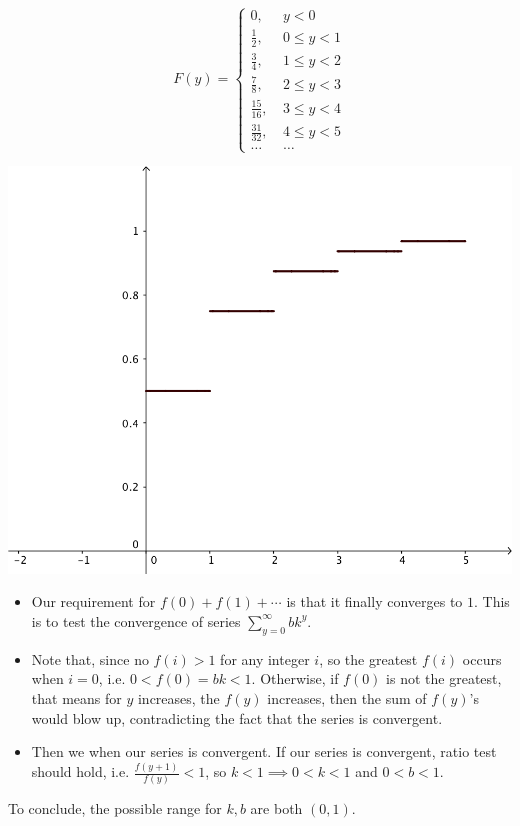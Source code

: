 \documentclass[a4paper, 11pt, twoside]{article}
\begin{document}
\[F(y)=\begin{cases}
0,\ &y<0\\
\frac{1}{2},\ &0\leq y< 1\\
\frac{3}{4},\ &1\leq y<2\\
\frac{7}{8},\ &2\leq y<3\\
\frac{15}{16},\ &3\leq y<4\\
\frac{31}{32},\ &4\leq y<5\\
\dots &\dots	
\end{cases}
\]

\includegraphics{image/3a-cdf}

\begin{itemize}
	\item Our requirement for $f(0)+f(1)+\cdots$ is that it finally converges to $1$. This is to test the convergence of series $\sum^{\infty}_{y=0}bk^y$.
	\item Note that, since no $f(i) > 1$ for any integer $i$, so the greatest $f(i)$ occurs when $i=0$, i.e. $0<f(0)=bk<1$. Otherwise, if $f(0)$ is not the greatest, that means for $y$ increases, the $f(y)$ increases, then the sum of $f(y)$'s would blow up, contradicting the fact that the series is convergent.
	\item Then we when our series is convergent. If our series is convergent, ratio test should hold, i.e. $\frac{f(y+1)}{f(y)}<1$, so $k<1\implies 0<k<1$ and $0<b<1$.
\end{itemize}

To conclude, the possible range for $k, b$ are both $(0,1)$.
\end{document}
